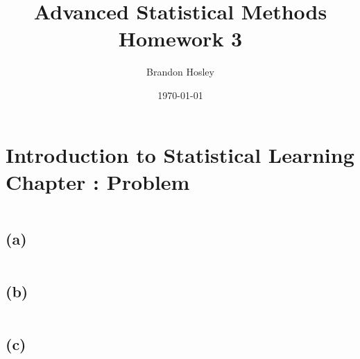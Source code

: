 \documentclass[a4paper,man,natbib]{apa6}
\title{Advanced Statistical Methods Homework 3}
\author{Brandon Hosley}
\date{\today}
\affiliation{University of Illinois - Springfield}
\begin{document}
\maketitle
\singlespacing

\section{Introduction to Statistical Learning \\ Chapter : Problem }

\begin{verbatim}
\end{verbatim}

\subsection{(a)} 
\emph{ }
\begin{verbatim}
\end{verbatim}

\subsection{(b)}
\emph{ }
\begin{verbatim}
\end{verbatim}

\subsection{(c)}
\emph{ }
\begin{verbatim}
\end{verbatim}
	
\end{document}

